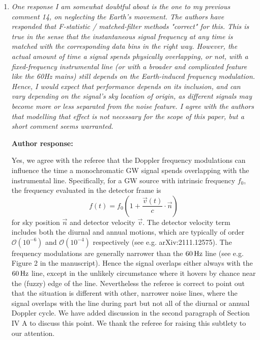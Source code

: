 \documentclass[10pt]{article}
\begin{document}
\begin{enumerate}
	\item  \textit{One response I am somewhat doubtful about is the one to my previous comment
	14, on neglecting the Earth’s movement. The authors have responded that
	F-statistic / matched-filter methods "correct" for this. This is true in the
	sense that the instantaneous signal frequency at any time is matched with the corresponding data bins in the right way. However, the actual amount of time a signal spends physically overlapping, or not, with a fixed-frequency instrumental line (or with a broader and complicated feature like the 60Hz mains) still depends on the Earth-induced frequency modulation. Hence, I would expect that performance depends on its inclusion, and can vary depending on the signal's sky location of origin, as different signals may become more or less separated from the noise feature. I agree with the authors that modelling that effect is not necessary for the scope of this paper, but a short comment seems warranted.}
	
			\textbf{Author response:} 
			
			Yes, we agree with the referee that the Doppler frequency modulations can influence the time a monochromatic GW signal spends overlapping with the instrumental line. Specifically, for a GW source with intrinsic frequency $f_0$, the frequency evaluated in the detector frame is 
			\begin{equation}
				f(t) = f_0 \left(1 + \frac{\vec{v}(t)}{c} \cdot \vec{n}\right)
			\end{equation}
		for sky position $\vec{n}$ and detector velocity $\vec{v}$. The detector velocity term includes both the diurnal and annual motions, which are typically of order $\mathcal{O} \left(10^{-6}\right)$ and $\mathcal{O} \left(10^{-4}\right)$ respectively (see e.g. arXiv:2111.12575). The frequency modulations are generally narrower than the $60\,{\rm Hz}$ line (see e.g. Figure 2 in the manuscript). Hence the signal overlaps either always with the $60 \, {\rm Hz}$ line, except in the unlikely circumstance where it hovers by chance near the (fuzzy) edge of the line. Nevertheless the referee is correct to point out that the situation is different with other, narrower noise lines, where the signal overlaps with the line during part but not all of the diurnal or annual Doppler cycle. We have added discussion in the second paragraph of Section IV A to discuss this point. We thank the referee for raising this subtlety to our attention.


\end{enumerate}
\end{document}

